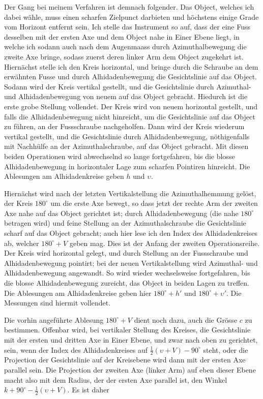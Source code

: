 \par\indent Der Gang bei meinem Verfahren ist demnach folgender. Das Object, welches ich dabei wähle, muss einen scharfen Zielpunct darbieten und höchstens einige Grade vom Horizont entfernt sein. Ich stelle das Instrument so auf, dass der eine Fuss desselben mit der ersten Axe und dem Object nahe in Einer Ebene liegt, in welche ich sodann auch nach dem Augenmaass durch Azimuthalbewegung die zweite Axe bringe, sodass zuerst deren linker Arm dem Object zugekehrt ist. Hiernächst stelle ich den Kreis horizontal, und bringe durch die Schraube an dem erwähnten Fusse und durch Alhidadenbewegung die Gesichtslinie auf das Object. Sodann wird der Kreis vertikal gestellt, und die Gesichtslinie durch Azimuthal- und Alhidadenbewegung von neuem auf das Object gebracht. Hiedurch ist die erste grobe Stellung vollendet. Der Kreis wird von neuem horizontal gestellt, und falls die Alhidadenbewegung nicht hinreicht, um die Gesichtslinie auf das Object zu führen, an der Fussschraube nachgeholfen. Dann wird der Kreis wiederum vertikal gestellt, und die Gesichtslinie durch Alhidadenbewegung, nöthigenfalls mit Nachhülfe an der Azimuthalschraube, auf das Object gebracht. Mit diesen beiden Operationen wird abwechselnd so lange fortgefahren, bis die blosse Alhidadenbewegung in horizontaler Lage zum scharfen Pointiren hinreicht. Die Ablesungen am Alhidadenkreise geben $h$ und $\upsilon$.

\par\indent Hiernächst wird nach der letzten Vertikalstellung die Azimuthalhemmung gelöst, der Kreis $180^\circ$ um die erste Axe bewegt, so dass jetzt der rechte Arm der zweiten Axe nahe auf das Object gerichtet ist; durch Alhidadenbewegung (die nahe $180^\circ$ betragen wird) und feine Stellung an der Azimuthalschraube die Gesichtslinie scharf auf das Object gebracht; auch hier lese ich den Index des Alhidadenkreises ab, welcher $180^\circ+V$ geben mag. Dies ist der Anfang der zweiten Operationsreihe. Der Kreis wird horizontal gelegt, und durch Stellung an der Fussschraube und Alhidadenbewegung pointirt; bei der neuen Vertikalstellung wird Azimuthal- und Alhidadenbewegung angewandt. So wird wieder wechselsweise fortgefahren, bis die blosse Alhidadenbewegung zureicht, das Object in beiden Lagen zu treffen. Die Ablesungen am Alhidadenkreise geben hier $180^\circ+h'$ und $180^\circ+\upsilon'$. Die Messungen sind hiermit vollendet.

\par\indent Die vorhin angeführte Ablesung $180^\circ+V$ dient noch dazu, auch die Grösse $c$ zu bestimmen. Offenbar wird, bei vertikaler Stellung des Kreises, die Gesichtslinie mit der ersten und dritten Axe in Einer Ebene, und zwar nach oben zu gerichtet, sein, wenn der Index des Alhidadenkreises auf $\tfrac{1}{2}(\upsilon+V)-90^\circ$ steht, oder die Projection der Gesichtslinie auf der Kreisebene wird dann mit der ersten Axe parallel sein. Die Projection der zweiten Axe (linker Arm) auf eben dieser Ebene macht also mit dem Radius, der der ersten Axe parallel ist, den Winkel $k+90^\circ-\tfrac{1}{2}(\upsilon+V)$. Es ist daher

